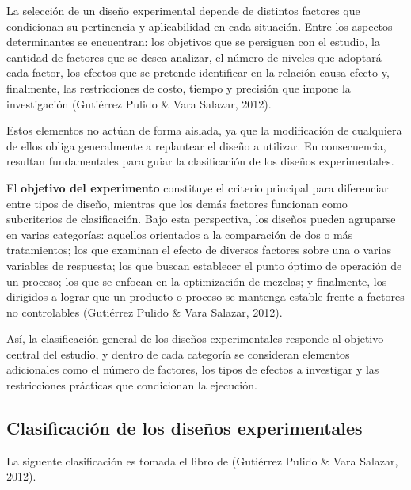 \documentclass[
  spanish,
  letterpaper,
  DIV=11,
  numbers=noendperiod]{scrreprt}
\begin{document}
La selección de un diseño experimental depende de distintos factores que
condicionan su pertinencia y aplicabilidad en cada situación. Entre los
aspectos determinantes se encuentran: los objetivos que se persiguen con
el estudio, la cantidad de factores que se desea analizar, el número de
niveles que adoptará cada factor, los efectos que se pretende
identificar en la relación causa-efecto y, finalmente, las restricciones
de costo, tiempo y precisión que impone la investigación (Gutiérrez
Pulido \& Vara Salazar, 2012).

Estos elementos no actúan de forma aislada, ya que la modificación de
cualquiera de ellos obliga generalmente a replantear el diseño a
utilizar. En consecuencia, resultan fundamentales para guiar la
clasificación de los diseños experimentales.

El \textbf{objetivo del experimento} constituye el criterio principal
para diferenciar entre tipos de diseño, mientras que los demás factores
funcionan como subcriterios de clasificación. Bajo esta perspectiva, los
diseños pueden agruparse en varias categorías: aquellos orientados a la
comparación de dos o más tratamientos; los que examinan el efecto de
diversos factores sobre una o varias variables de respuesta; los que
buscan establecer el punto óptimo de operación de un proceso; los que se
enfocan en la optimización de mezclas; y finalmente, los dirigidos a
lograr que un producto o proceso se mantenga estable frente a factores
no controlables (Gutiérrez Pulido \& Vara Salazar, 2012).

Así, la clasificación general de los diseños experimentales responde al
objetivo central del estudio, y dentro de cada categoría se consideran
elementos adicionales como el número de factores, los tipos de efectos a
investigar y las restricciones prácticas que condicionan la ejecución.

\subsection{\texorpdfstring{\textbf{Clasificación de los diseños
experimentales}}{Clasificación de los diseños experimentales}}\label{clasificaciuxf3n-de-los-diseuxf1os-experimentales}

La siguente clasificación es tomada el libro de (Gutiérrez Pulido \&
Vara Salazar, 2012).
\end{document}
